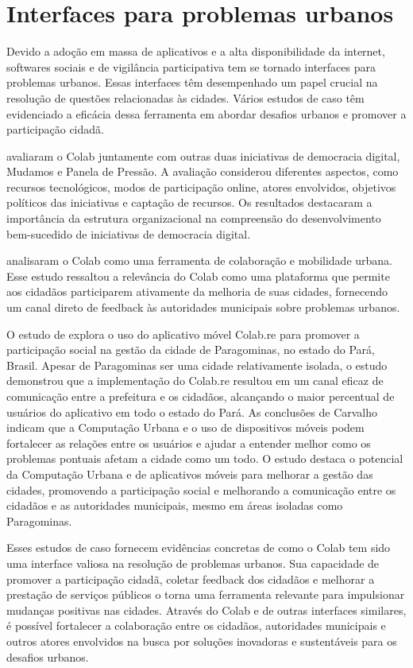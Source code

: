 \section*{Interfaces para problemas urbanos}
Devido a adoção em massa de aplicativos e a alta disponibilidade da internet, softwares sociais e de vigilância participativa tem se tornado interfaces para problemas urbanos. Essas interfaces têm desempenhado um papel crucial na resolução de questões relacionadas às cidades. Vários estudos de caso têm evidenciado a eficácia dessa ferramenta em abordar desafios urbanos e promover a participação cidadã.

 avaliaram o Colab juntamente com outras duas iniciativas de democracia digital, Mudamos e Panela de Pressão. A avaliação considerou diferentes aspectos, como recursos tecnológicos, modos de participação online, atores envolvidos, objetivos políticos das iniciativas e captação de recursos. Os resultados destacaram a importância da estrutura organizacional na compreensão do desenvolvimento bem-sucedido de iniciativas de democracia digital.

 analisaram o Colab como uma ferramenta de colaboração e mobilidade urbana. Esse estudo ressaltou a relevância do Colab como uma plataforma que permite aos cidadãos participarem ativamente da melhoria de suas cidades, fornecendo um canal direto de feedback às autoridades municipais sobre problemas urbanos.

O estudo de  explora o uso do aplicativo móvel Colab.re para promover a participação social na gestão da cidade de Paragominas, no estado do Pará, Brasil. Apesar de Paragominas ser uma cidade relativamente isolada, o estudo demonstrou que a implementação do Colab.re resultou em um canal eficaz de comunicação entre a prefeitura e os cidadãos, alcançando o maior percentual de usuários do aplicativo em todo o estado do Pará. As conclusões de Carvalho indicam que a Computação Urbana e o uso de dispositivos móveis podem fortalecer as relações entre os usuários e ajudar a entender melhor como os problemas pontuais afetam a cidade como um todo. O estudo destaca o potencial da Computação Urbana e de aplicativos móveis para melhorar a gestão das cidades, promovendo a participação social e melhorando a comunicação entre os cidadãos e as autoridades municipais, mesmo em áreas isoladas como Paragominas.

Esses estudos de caso fornecem evidências concretas de como o Colab tem sido uma interface valiosa na resolução de problemas urbanos. Sua capacidade de promover a participação cidadã, coletar feedback dos cidadãos e melhorar a prestação de serviços públicos o torna uma ferramenta relevante para impulsionar mudanças positivas nas cidades. Através do Colab e de outras interfaces similares, é possível fortalecer a colaboração entre os cidadãos, autoridades municipais e outros atores envolvidos na busca por soluções inovadoras e sustentáveis para os desafios urbanos.

